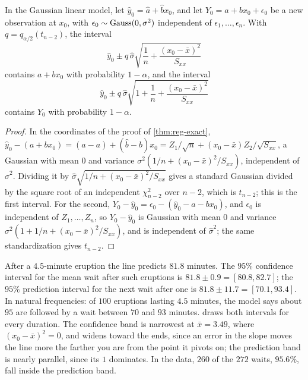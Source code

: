 \begin{proposition}
\label{prop:reg-predict}
In the Gaussian linear model, let $\hat{y}_0 = \hat{a} + \hat{b}x_0$, and let $Y_0 = a + bx_0 + \epsilon_0$ be a new observation at $x_0$, with $\epsilon_0 \sim \text{Gauss}(0, \sigma^2)$ independent of $\epsilon_1, \ldots, \epsilon_n$.
With $q = q_{\alpha/2}(t_{n-2})$, the interval
\[
\hat{y}_0 \pm q\,\hat{\sigma}\sqrt{\frac1n + \frac{(x_0 - \bar{x})^2}{S_{xx}}}
\]
contains $a + bx_0$ with probability $1 - \alpha$, and the interval
\[
\hat{y}_0 \pm q\,\hat{\sigma}\sqrt{1 + \frac1n + \frac{(x_0 - \bar{x})^2}{S_{xx}}}
\]
contains $Y_0$ with probability $1 - \alpha$.
\end{proposition}
\begin{proof}
In the coordinates of the proof of \cref{thm:reg-exact}, $\hat{y}_0 - (a + bx_0) = (\hat{a} - a) + (\hat{b} - b)x_0 = Z_1/\sqrt{n} + (x_0 - \bar{x})Z_2/\sqrt{S_{xx}}$, a Gaussian with mean $0$ and variance $\sigma^2(1/n + (x_0 - \bar{x})^2/S_{xx})$, independent of $\hat{\sigma}^2$.
Dividing it by $\hat{\sigma}\sqrt{1/n + (x_0 - \bar{x})^2/S_{xx}}$ gives a standard Gaussian divided by the square root of an independent $\chi^2_{n-2}$ over $n - 2$, which is $t_{n-2}$; this is the first interval.
For the second, $Y_0 - \hat{y}_0 = \epsilon_0 - (\hat{y}_0 - a - bx_0)$, and $\epsilon_0$ is independent of $Z_1, \ldots, Z_n$, so $Y_0 - \hat{y}_0$ is Gaussian with mean $0$ and variance $\sigma^2(1 + 1/n + (x_0 - \bar{x})^2/S_{xx})$, and is independent of $\hat{\sigma}^2$; the same standardization gives $t_{n-2}$.
\end{proof}

After a $4.5$-minute eruption the line predicts $81.8$ minutes.
The $95\%$ confidence interval for the mean wait after such eruptions is $81.8 \pm 0.9 = [80.8, 82.7]$; the $95\%$ prediction interval for the next wait after one is $81.8 \pm 11.7 = [70.1, 93.4]$.
In natural frequencies: of $100$ eruptions lasting $4.5$ minutes, the model says about $95$ are followed by a wait between $70$ and $93$ minutes.
 draws both intervals for every duration.
The confidence band is narrowest at $\bar{x} = 3.49$, where $(x_0 - \bar{x})^2 = 0$, and widens toward the ends, since an error in the slope moves the line more the farther you are from the point it pivots on; the prediction band is nearly parallel, since its $1$ dominates.
In the data, $260$ of the $272$ waits, $95.6\%$, fall inside the prediction band.


